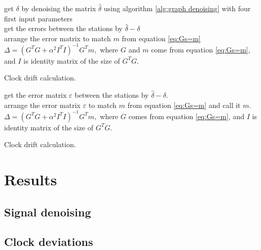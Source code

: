 \documentclass[12pt, sumlimits, intlimits]{article}
\begin{document}
\begin{algorithm}[H]
	get $\delta$ by denoising the matrix $\hat{\delta}$ using algorithm \ref{alg:graph denoising} with four first input parameters\\
	get the errors between the stations by $\hat{\delta} - \delta$\\
	arrange the error matrix to match $m$ from equation \ref{eq:Gs=m}\\
	$\Delta = (G^TG + \alpha^2I^TI)^{-1}G^Tm,$ where $G$ and $m$ come from equation \ref{eq:Gs=m}, and $I$ is identity matrix of the size of $G^TG$. 
	\caption{Clock drift calculation.}
 	\label{alg:delay calculation}
\end{algorithm}
\fi
\begin{algorithm}[H]
	get the error matrix $\varepsilon$ between the stations by $\hat{\delta} - \delta$.\\
	arrange the error matrix $\varepsilon$ to match $m$ from equation  \ref{eq:Gs=m} and call it $m$.\\
	$\Delta = (G^TG + \alpha^2I^TI)^{-1}G^Tm,$ where $G$ comes from equation \ref{eq:Gs=m}, and $I$ is identity matrix of the size of $G^TG$. 
	\caption{Clock drift calculation.}
	\label{alg:delay calculation}
\end{algorithm}

\section{Results}
\subsection{Signal denoising}


\subsection{Clock deviations}
\end{document}
